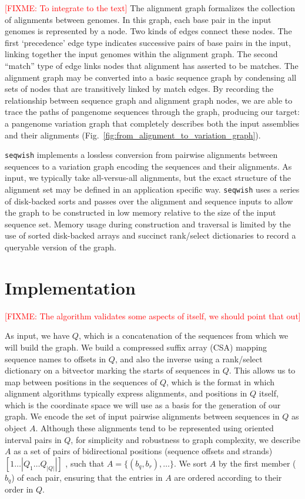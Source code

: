 \documentclass{bioinfo}
\newcommand{\red}[1]{{\textcolor{Red}{#1}}}
\newcommand{\FIXME}[1]{\red{[FIXME: #1]}}
\begin{document}
    \FIXME{To integrate to the text} The alignment graph formalizes the collection of alignments between genomes.
    In this graph, each base pair in the input genomes is represented by a node.
    Two kinds of edges connect these nodes.
    The first `precedence' edge type indicates successive pairs of base pairs in the input,
    linking together the input genomes within the alignment graph.
    The second “match” type of edge links nodes that alignment has asserted to be matches.
    The alignment graph may be converted into a basic sequence graph by condensing all sets of nodes that are transitively linked by match edges.
    By recording the relationship between sequence graph and alignment graph nodes, we are able to trace the paths of pangenome sequences through the
    graph, producing our target: a pangenome variation graph that completely describes both the input assemblies and their alignments (Fig.~\ref{fig:from_alignment_to_variation_graph}).

    \texttt{seqwish} implements a lossless conversion from pairwise alignments between sequences to a variation graph encoding the sequences and their alignments.
    As input, we typically take all-versus-all alignments, but the exact structure of the alignment set may be defined in an application specific way.
    \texttt{seqwish} uses a series of disk-backed sorts and passes over the alignment and sequence inputs to allow the graph to be constructed in low memory relative to the size of the input sequence set.
    Memory usage during construction and traversal is limited by the use of sorted disk-backed arrays and succinct rank/select dictionaries to record a queryable version of the graph.

    


    \section{Implementation}
    \label{sec:implementation}

    \FIXME{The algorithm validates some aspects of itself, we should point that out}

    As input, we have $Q$, which is a concatenation of the sequences from which we will build the graph.
    We build a compressed suffix array (CSA) mapping sequence names to offsets in $Q$, and also the inverse using a rank/select dictionary on a bitvector marking the starts of sequences in $Q$.
    This allows us to map between positions in the sequences of $Q$, which is the format in which alignment algorithms typically express alignments, and positions in $Q$ itself, which is the coordinate space we will use as a basis for the generation of our graph.
    We encode the set of input pairwise alignments between sequences in $Q$ as object $A$.
    Although these alignments tend to be represented using oriented interval pairs in $Q$, for simplicity and robustness to graph complexity, we describe $A$ as a set of pairs of bidirectional positions (sequence offsets and strands) $[1 \ldots |Q_1 \ldots Q_{|Q|}|]$ , such that $A = \{ (b_{q}, b_{r}), \ldots \}$.
    We sort $A$ by the first member ($b_{q}$) of each pair, ensuring that the entries in $A$ are ordered according to their order in $Q$.
\end{document}
